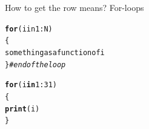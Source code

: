 \documentclass[10pt]{beamer}\usepackage[]{graphicx}\usepackage[]{color}
\makeatletter
\newcommand{\hlnum}[1]{\textcolor[rgb]{0.686,0.059,0.569}{#1}}%
\newcommand{\hlcom}[1]{\textcolor[rgb]{0.678,0.584,0.686}{\textit{#1}}}%
\newcommand{\hlopt}[1]{\textcolor[rgb]{0,0,0}{#1}}%
\newcommand{\hlstd}[1]{\textcolor[rgb]{0.345,0.345,0.345}{#1}}%
\newcommand{\hlkwa}[1]{\textcolor[rgb]{0.161,0.373,0.58}{\textbf{#1}}}%
\newcommand{\hlkwd}[1]{\textcolor[rgb]{0.737,0.353,0.396}{\textbf{#1}}}%
\newenvironment{kframe}{%
 \def\at@end@of@kframe{}%
 \ifinner\ifhmode%
  \def\at@end@of@kframe{\end{minipage}}%
  \begin{minipage}{\columnwidth}%
 \fi\fi%
 \def\FrameCommand##1{\hskip\@totalleftmargin \hskip-\fboxsep
 \colorbox{shadecolor}{##1}\hskip-\fboxsep
     \hskip-\linewidth \hskip-\@totalleftmargin \hskip\columnwidth}%
 \MakeFramed {\advance\hsize-\width
   \@totalleftmargin\z@ \linewidth\hsize
   \@setminipage}}%
 {\par\unskip\endMakeFramed%
 \at@end@of@kframe}
\newenvironment{knitrout}{}{} %
\makeatother
\begin{document}
\begin{frame}[fragile]{How to get the row means? For-loops}

\begin{knitrout}
\color{fgcolor}\begin{kframe}
\begin{alltt}
  \hlkwd{for} (i in 1:N)
  \{
    something as a function of i
  \}\hlcom{#end of the loop}
\end{alltt}
\end{kframe}
\end{knitrout}

  \pause
\begin{knitrout}
\color{fgcolor}\begin{kframe}
\begin{alltt}
  \hlkwa{for} \hlstd{(i} \hlkwa{in} \hlnum{1}\hlopt{:}\hlnum{31}\hlstd{)}
  \hlstd{\{}
    \hlkwd{print}\hlstd{(i)}
  \hlstd{\}}
\end{alltt}
\end{kframe}
\end{knitrout}

\end{frame}
\end{document}

